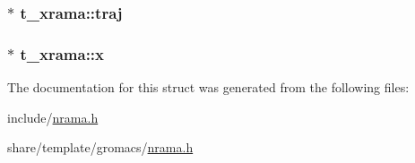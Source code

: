 \hypertarget{structt__xrama_adf20ce61d0b53825182d2f6e3dd67657}{
\subsubsection[{traj}]{ $\ast$ {\bf t\-\_\-xrama\-::traj}}}\label{structt__xrama_adf20ce61d0b53825182d2f6e3dd67657}
\hypertarget{structt__xrama_a43148aa9cfd8a5fa23683b967691d908}{
\subsubsection[{x}]{ $\ast$ {\bf t\-\_\-xrama\-::x}}}\label{structt__xrama_a43148aa9cfd8a5fa23683b967691d908}


\-The documentation for this struct was generated from the following files\-:\begin{DoxyCompactItemize}
\item 
include/\hyperlink{include_2nrama_8h}{nrama.\-h}\item 
share/template/gromacs/\hyperlink{share_2template_2gromacs_2nrama_8h}{nrama.\-h}\end{DoxyCompactItemize}
